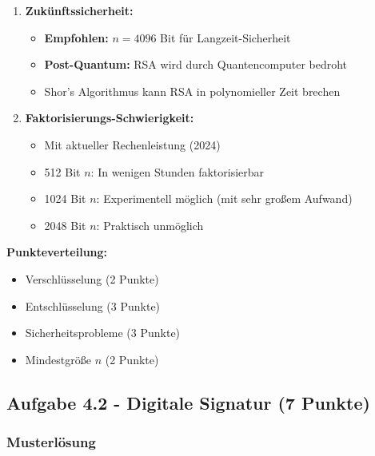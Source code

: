 \documentclass[12pt,a4paper]{article}
\begin{document}
\begin{tcolorbox}[colback=solutionbg, colframe=black!30]
\begin{enumerate}[1.]
    \item \textbf{Zukünftssicherheit:}
    \begin{itemize}
        \item \textbf{Empfohlen:} $n = 4096$ Bit für Langzeit-Sicherheit
        \item \textbf{Post-Quantum:} RSA wird durch Quantencomputer bedroht
        \item Shor's Algorithmus kann RSA in polynomieller Zeit brechen
    \end{itemize}
    
    \item \textbf{Faktorisierungs-Schwierigkeit:}
    \begin{itemize}
        \item Mit aktueller Rechenleistung (2024)
        \item 512 Bit $n$: In wenigen Stunden faktorisierbar
        \item 1024 Bit $n$: Experimentell möglich (mit sehr großem Aufwand)
        \item 2048 Bit $n$: Praktisch unmöglich
    \end{itemize}
\end{enumerate}

\end{tcolorbox}

\textbf{Punkteverteilung:}
\begin{itemize}
    \item Verschlüsselung (2 Punkte) \checkmark
    \item Entschlüsselung (3 Punkte) \checkmark
    \item Sicherheitsprobleme (3 Punkte) \checkmark
    \item Mindestgröße $n$ (2 Punkte) \checkmark
\end{itemize}

\subsection{Aufgabe 4.2 - Digitale Signatur (7 Punkte)}

\subsubsection*{Musterlösung}
\end{document}
